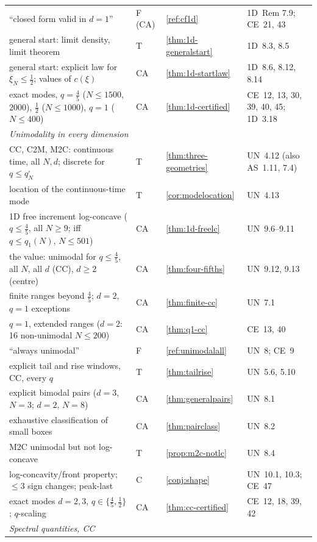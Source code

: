 \documentclass[10pt,a4paper]{article}
\theoremstyle{plain}
\theoremstyle{definition}
\newcommand{\ONE}{\textsf{1D}}
\newcommand{\ASY}{\textsf{AS}}
\newcommand{\UNI}{\textsf{UN}}
\newcommand{\CER}{\textsf{CE}}
\newcommand{\qbox}{q^{\square}_N}
\begin{document}
{\begin{longtable}{p{}p{}p{}p{}}
``closed form valid in $d=1$'' & F (CA) & \ref{ref:cf1d} & \ONE\ Rem 7.9; \CER\ 21, 43\\
general start: limit density, limit theorem & T & \ref{thm:1d-generalstart} & \ONE\ 8.3, 8.5\\
general start: explicit law for $\xi_N\le\frac12$; values of $c(\xi)$ & CA & \ref{thm:1d-startlaw} & \ONE\ 8.6, 8.12, 8.14\\
exact modes, $q=\frac45$ ($N\le1500$, $2000$), $\frac12$ ($N\le1000$), $q=1$ ($N\le400$) & CA & \ref{thm:1d-certified} & \CER\ 12, 13, 30, 39, 40, 45; \ONE\ 3.18\\
\midrule
\multicolumn{4}{l}{\emph{Unimodality in every dimension}}\\
CC, C2M, M2C: continuous time, all $N,d$; discrete for $q\le\qbox$ & T & \ref{thm:three-geometries} & \UNI\ 4.12 (also \ASY\ 1.11, 7.4)\\
location of the continuous-time mode & T & \ref{cor:modelocation} & \UNI\ 4.13\\
1D free increment log-concave ($q\le\frac45$, all $N\ge9$; iff $q\le q_1(N)$, $N\le501$) & CA & \ref{thm:1d-freelc} & \UNI\ 9.6--9.11\\
the value: unimodal for $q\le\frac45$, all $N$, all $d$ (CC), $d\ge2$ (centre) & CA & \ref{thm:four-fifths} & \UNI\ 9.12, 9.13\\
finite ranges beyond $\frac45$; $d=2$, $q=1$ exceptions & CA & \ref{thm:finite-cc} & \UNI\ 7.1\\
$q=1$, extended ranges ($d=2$: 16 non-unimodal $N\le200$) & CA & \ref{thm:q1-cc} & \CER\ 13, 40\\
``always unimodal'' & F & \ref{ref:unimodalall} & \UNI\ 8; \CER\ 9\\
explicit tail and rise windows, CC, every $q$ & T & \ref{thm:tailrise} & \UNI\ 5.6, 5.10\\
explicit bimodal pairs ($d=3$, $N=3$; $d=2$, $N=8$) & CA & \ref{thm:generalpairs} & \UNI\ 8.1\\
exhaustive classification of small boxes & CA & \ref{thm:pairclass} & \UNI\ 8.2\\
M2C unimodal but not log-concave & T & \ref{prop:m2c-notlc} & \UNI\ 8.4\\
log-concavity/front property; $\le3$ sign changes; peak-last & C & \ref{conj:shape} & \UNI\ 10.1, 10.3; \CER\ 47\\
exact modes $d=2,3$, $q\in\{\frac45,\frac12\}$; $q$-scaling & CA & \ref{thm:cc-certified} & \CER\ 12, 18, 39, 42\\
\midrule
\multicolumn{4}{l}{\emph{Spectral quantities, CC}}\\

\end{longtable}}
\end{document}
